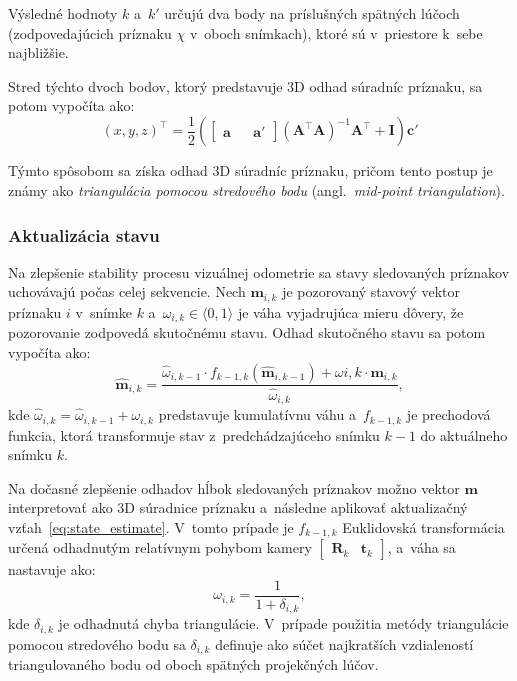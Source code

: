       Výsledné hodnoty $k$ a~$k'$ určujú dva body na príslušných spätných lúčoch (zodpovedajúcich príznaku $\chi$ v~oboch snímkach), ktoré sú v~priestore k~sebe najbližšie.

      Stred týchto dvoch bodov, ktorý predstavuje 3D odhad súradníc príznaku, sa potom vypočíta ako:
      \begin{equation}
      {(x, y, z)}^{\top} = \frac{1}{2} \left( \begin{bmatrix} \mathbf{a} & & \mathbf{a}' \end{bmatrix}
      {\left( \mathbf{A}^\top \mathbf{A} \right)}^{-1} \mathbf{A}^\top + \mathbf{I} \right) \mathbf{c}'
      \label{eq:midpoint}
      \end{equation}

      Týmto spôsobom sa získa odhad 3D súradníc príznaku, pričom tento postup je známy ako \emph{triangulácia pomocou stredového bodu} (angl.\ \emph{mid-point triangulation}).

    \subsubsection{Aktualizácia stavu}

      Na zlepšenie stability procesu vizuálnej odometrie sa stavy sledovaných príznakov uchovávajú počas celej sekvencie. Nech $\mathbf{m}_{i,k}$ je pozorovaný stavový vektor príznaku $i$ v~snímke $k$ a~$\omega_{i,k} \in \langle 0, 1 \rangle$ je váha vyjadrujúca mieru dôvery, že pozorovanie zodpovedá skutočnému stavu. Odhad skutočného stavu sa potom vypočíta ako:
      \begin{equation}
      \hat{\mathbf{m}}_{i,k} =
      \frac{\hat{\omega}_{i,k-1} \cdot f_{k-1,k}(\hat{\mathbf{m}}_{i,k-1}) + \omega{i,k} \cdot \mathbf{m}_{i,k}}{\hat{\omega}_{i,k}},
      \label{eq:state_estimate}
      \end{equation}
      kde $\hat{\omega}_{i,k} = \hat{\omega}_{i,k-1} + \omega_{i,k}$ predstavuje kumulatívnu váhu a~$f_{k-1,k}$ je prechodová funkcia, ktorá transformuje stav z~predchádzajúceho snímku $k-1$ do aktuálneho snímku $k$.

      Na dočasné zlepšenie odhadov hĺbok sledovaných príznakov možno vektor $\mathbf{m}$ interpretovať ako 3D súradnice príznaku a~následne aplikovať aktualizačný vzťah~\eqref{eq:state_estimate}. V~tomto prípade je $f_{k-1,k}$ Euklidovská transformácia určená odhadnutým relatívnym pohybom kamery $\begin{bmatrix} \mathbf{R}_k & \mathbf{t}_k \end{bmatrix}$, a~váha sa nastavuje ako:
      \begin{equation}
      \omega_{i,k} = \frac{1}{1 + \delta_{i,k}},
      \label{eq:triangulation_weight}
      \end{equation}
      kde $\delta_{i,k}$ je odhadnutá chyba triangulácie. V~prípade použitia metódy triangulácie pomocou stredového bodu sa $\delta_{i,k}$ definuje ako súčet najkratších vzdialeností triangulovaného bodu od oboch spätných projekčných lúčov.

